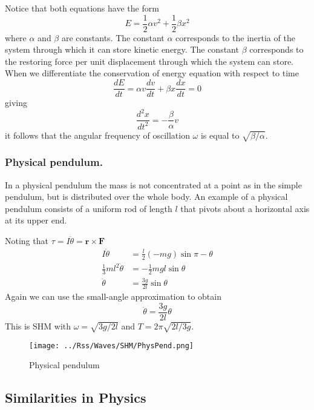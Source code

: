 \documentclass[../main.tex]{subfiles}
\begin{document}
Notice that both equations have the form
\begin{equation*}
    E=\frac{1}{2}\alpha v^2+\frac{1}{2}\beta x^2
\end{equation*}
where $\alpha$ and $\beta$ are constants. The constant $\alpha$ corresponds to the inertia of the system through which it can store kinetic energy. The constant $\beta$ corresponds to the restoring force per unit displacement through which the system can store. When we differentiate the conservation of energy equation with respect to time 
\begin{equation*}
    \frac{dE}{dt}=\alpha v\frac{dv}{dt}+\beta x\frac{dx}{dt}=0
\end{equation*}
giving
\begin{equation*}
    \frac{d^2x}{dt^2}=-\frac{\beta}{\alpha}v
\end{equation*}
it follows that the angular frequency of oscillation $\omega$ is equal to $\sqrt{\beta/\alpha}$.

\subsubsection*{Physical pendulum.} In a physical pendulum the mass is not concentrated at a point as in the simple pendulum, but is distributed over the whole body. An example of a physical pendulum consists of a uniform rod of length $l$ that pivots about a horizontal axis at its upper end. 

Noting that $\tau=I\ddot{\theta}=\mathbf{r}\times\mathbf{F}$
\begin{align*}
    I\ddot{\theta}&=\frac{l}{2}(-mg)\sin \pi-\theta\\
    \frac{1}{3}ml^2\ddot{\theta}&=-\frac{1}{2}mgl\sin \theta\\
    \ddot{\theta}&=\frac{3g}{2l}\sin\theta
\end{align*}
Again we can use the small-angle approximation to obtain
\begin{equation*}
    \ddot{\theta}=\frac{3g}{2l}\theta
\end{equation*}
This is SHM with $\omega = \sqrt{3g/2l} $ and $T = 2\pi \sqrt{2l/3g}$.
\begin{figure*}[h]
    \centering
    \texttt{[image: ../Rss/Waves/SHM/PhysPend.png]}
    \caption*{Physical pendulum}
\end{figure*}

\subsection*{Similarities in Physics}
\end{document}
